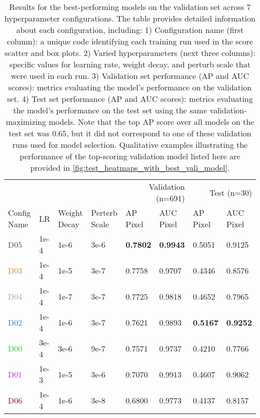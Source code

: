 \begin{table*}[t]
\caption{
Results for the best-performing models on the validation set across 7 hyperparameter configurations.
The table provides detailed information about each configuration, including:
1) Configuration name (first column): a unique code identifying each training run used in the score scatter and box plots.
2) Varied hyperparameters (next three columns): specific values for learning rate, weight decay, and perturb scale that were used in each run.
3) Validation set performance (AP and AUC scores): metrics evaluating the model's performance on the validation set.
4) Test set performance (AP and AUC scores): metrics evaluating the model's performance on the test set using the same validation-maximizing models.
Note that the top AP score over all models on the test set was 0.65, but it did not correspond to one of these validation runs used for model selection.
Qualitative examples illustrating the performance of the top-scoring validation model listed here are provided in \cref{fig:test_heatmaps_with_best_vali_model}.
}
\label{tab:parameters_and_results}
\centering
\begin{tabular}{llllllll}
\toprule
            \multicolumn{4}{l}{} & \multicolumn{2}{r}{Validation (n=691)} & \multicolumn{2}{r}{Test (n=30)} \\
Config Name  &   LR & Weight Decay & Perterb Scale & \makecell{AP\\Pixel} & \makecell{AUC\\Pixel} &  \makecell{AP\\Pixel} &  \makecell{AUC\\Pixel} \\
\midrule
        \textcolor[HTML]{623682}{D05} & 1e-4 &   1e-6 &  3e-6 & \textbf{0.7802} & \textbf{0.9943} &          0.5051 &          0.9125 \\
        \textcolor[HTML]{df8020}{D03} & 1e-4 &   1e-5 &  3e-7 &          0.7758 &          0.9707 &          0.4346 &          0.8576 \\
        \textcolor[HTML]{87b787}{D04} & 1e-4 &   1e-7 &  3e-7 &          0.7725 &          0.9818 &          0.4652 &          0.7965 \\
        \textcolor[HTML]{207fdf}{D02} & 1e-4 &   1e-6 &  3e-7 &          0.7621 &          0.9893 & \textbf{0.5167} & \textbf{0.9252} \\
        \textcolor[HTML]{20df20}{D00} & 3e-4 &   3e-6 &  9e-7 &          0.7571 &          0.9737 &          0.4210 &          0.7766 \\
        \textcolor[HTML]{df20df}{D01} & 1e-3 &   1e-5 &  3e-6 &          0.7070 &          0.9913 &          0.4607 &          0.9062 \\
        \textcolor[HTML]{b00403}{D06} & 1e-4 &   1e-6 &  3e-8 &          0.6800 &          0.9773 &          0.4137 &          0.8157 \\
        
\bottomrule
\end{tabular}
\end{table*}

